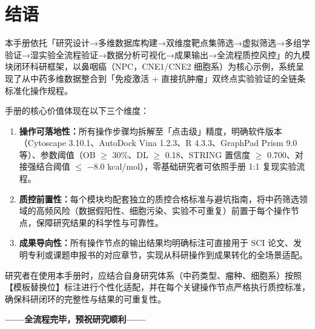 \documentclass[12pt,a4paper,twoside]{article}
\begin{document}
\section*{结语}

本手册依托「研究设计→多维数据库构建→双维度靶点集筛选→虚拟筛选→多组学验证→湿实验全流程验证→数据分析可视化→成果输出→全流程质控风控」的九模块闭环科研框架，以鼻咽癌（NPC，CNE1/CNE2 细胞系）为核心示例，系统呈现了从中药多维数据整合到「免疫激活 + 直接抗肿瘤」双终点实验验证的全链条标准化操作规程。

手册的核心价值体现在以下三个维度：

\begin{enumerate}
  \item \textbf{操作可落地性：}所有操作步骤均拆解至「点击级」精度，明确软件版本（Cytoscape 3.10.1、AutoDock Vina 1.2.3、R 4.3.3、GraphPad Prism 9.0 等）、参数阈值（OB $\geq$ 30\%、DL $\geq$ 0.18、STRING 置信度 $\geq$ 0.700、对接强结合阈值 $\leq$ $-$8.0 kcal/mol），零基础研究者可依照手册 1:1 复现实验流程。

  \item \textbf{质控前置性：}每个模块均配套独立的质控合格标准与避坑指南，将中药筛选领域的高频风险（数据假阳性、细胞污染、实验不可重复）前置于每个操作节点，保障研究结果的科学性与可靠性。

  \item \textbf{成果导向性：}所有操作节点的输出结果均明确标注可直接用于 SCI 论文、发明专利或课题申报书的对应章节，实现从科研操作到成果转化的全场景适配。
\end{enumerate}

研究者在使用本手册时，应结合自身研究体系（中药类型、瘤种、细胞系）按照【模板替换位】标注进行个性化适配，并在每个关键操作节点严格执行质控标准，确保科研闭环的完整性与结果的可重复性。

\vspace{12pt}

\begin{center}
{\large\bfseries\color{darkblue} ——全流程完毕，预祝研究顺利——}
\end{center}

\clearpage
{}


\end{document}
